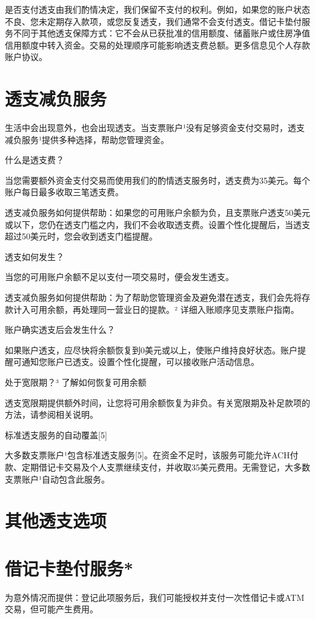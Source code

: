 \documentclass[UTF8,fontset=none,11pt,a4paper]{ctexart}
\begin{document}
是否支付透支由我们酌情决定，我们保留不支付的权利。例如，如果您的账户状态不良、您未定期存入款项，或您反复透支，我们通常不会支付透支。借记卡垫付服务不同于其他透支保障方式：它不会从已获批准的信用额度、储蓄账户或住房净值信用额度中转入资金。交易的处理顺序可能影响透支费总额。更多信息见个人存款账户协议。


\section*{透支减负服务}
生活中会出现意外，也会出现透支。当支票账户¹没有足够资金支付交易时，透支减负服务¹提供多种选择，帮助您管理资金。


什么是透支费？


当您需要额外资金支付交易而使用我们的酌情透支服务时，透支费为35美元。每个账户每日最多收取三笔透支费。


透支减负服务如何提供帮助：如果您的可用账户余额为负，且支票账户透支50美元或以下，您仍在透支门槛之内，我们不会收取透支费。设置个性化提醒后，当透支超过50美元时，您会收到透支门槛提醒。


透支如何发生？


当您的可用账户余额不足以支付一项交易时，便会发生透支。


透支减负服务如何提供帮助：为了帮助您管理资金及避免潜在透支，我们会先将存款计入可用余额，再处理同一营业日的提款。² 详细入账顺序见支票账户指南。


账户确实透支后会发生什么？


如果账户透支，应尽快将余额恢复到0美元或以上，使账户维持良好状态。账户提醒可通知您账户已透支。设置个性化提醒，可以接收账户活动信息。


处于宽限期？³ 了解如何恢复可用余额


透支宽限期提供额外时间，让您将可用余额恢复为非负。有关宽限期及补足款项的方法，请参阅相关说明。


标准透支服务的自动覆盖[5]


大多数支票账户¹包含标准透支服务[5]。在资金不足时，该服务可能允许ACH付款、定期借记卡交易及个人支票继续支付，并收取35美元费用。无需登记，大多数支票账户¹自动包含此服务。


\section*{其他透支选项}
\section*{借记卡垫付服务*}
为意外情况而提供：登记此项服务后，我们可能授权并支付一次性借记卡或ATM交易，但可能产生费用。
\end{document}
